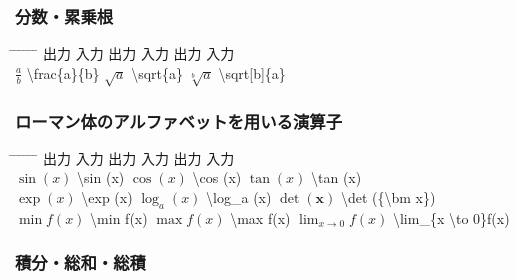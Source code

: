 \documentclass[11pt,a4j,onecolumn]{jsreport} %
\begin{document}
\subsubsection{分数・累乗根}

\begin{tabbing}
  \hspace{20truemm} \= \hspace{10truemm} \= \hspace{30truemm} \= \hspace{10truemm} \= \hspace{30truemm} \= \hspace{10truemm} \= \hspace{20truemm} \kill
  \> 出力 \> 入力 \> 出力 \> 入力 \> 出力 \> 入力 \\
  \> $\frac{a}{b}$ \> \textbackslash frac\{a\}\{b\} \> $\sqrt{a}$ \> \textbackslash sqrt\{a\} \> $\sqrt[b]{a}$ \> \textbackslash sqrt[b]\{a\} \\
\end{tabbing}

\subsubsection{ローマン体のアルファベットを用いる演算子}

\begin{tabbing}
  \hspace{5truemm} \= \hspace{20truemm} \= \hspace{25truemm} \= \hspace{20truemm} \= \hspace{25truemm} \= \hspace{20truemm} \= \hspace{25truemm} \kill
  \> 出力 \> 入力 \> 出力 \> 入力 \> 出力 \> 入力 \\
  \> $\sin (x)$ \> \textbackslash sin (x) \> $\cos (x)$ \> \textbackslash cos (x) \> $\tan (x)$ \> \textbackslash tan (x) \\
  \> $\exp (x)$ \> \textbackslash exp (x) \> $\log_a (x)$ \> \textbackslash log\_a (x) \> $\det ({\bm x})$ \> \textbackslash det (\{\textbackslash bm x\}) \\
  \> $\min f(x)$ \> \textbackslash min f(x) \> $\max f(x)$ \> \textbackslash max f(x) \> $\lim_{x \to 0}f(x)$ \> \textbackslash lim\_\{x \textbackslash to 0\}f(x) \\
\end{tabbing}

\subsubsection{積分・総和・総積}
\end{document}
